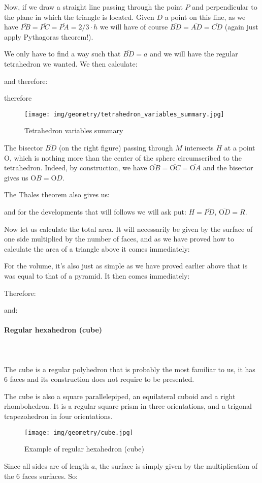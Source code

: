 {	Now, if we draw a straight line passing through the point $P$ and perpendicular to the plane in which the triangle is located. Given $D$ a point on this line, as we have $\overline{PB}=\overline{PC}=\overline{PA}=2/3\cdot h$ we will have of course $\overline{BD}=\overline{AD}=\overline{CD}$ (again just apply Pythagoras theorem!).
	
	We only have to find a way such that $\overline{BD}=a$ and we will have the regular tetrahedron we wanted. We then calculate:
	
	and therefore:
	
	therefore
	
	\begin{figure}[H]
		\centering
		\texttt{[image: img/geometry/tetrahedron\_variables\_summary.jpg]}
		\caption[]{Tetrahedron variables summary}
	\end{figure}
	The bisector $\overline{BD}$ (on the right figure) passing through $M$ intersects $H$ at a point O, which is nothing more than the center of the sphere circumscribed to the tetrahedron. Indeed, by construction, we have $\overline{\text{O}B}=\overline{\text{O}C}=\overline{\text{O}A}$ and the bisector gives us $\text{O}B=\text{O}D$.
	
	The Thales theorem also gives us:
	
	and for the developments that will follows we will ask put: $H=\overline{PD}$, $\overline{\text{O}D}=R$.
	
	Now let us calculate the total area. It will necessarily be given by the surface of one side multiplied by the number of faces, and as we have proved how to calculate the area of a triangle above it comes immediately:
	
	For the volume, it's also just as simple as we have proved earlier above that is was equal to that of a pyramid. It then comes immediately:
	
	Therefore:
	
	and:
	
	
	\pagebreak
	\paragraph{Regular hexahedron (cube)}\mbox{}\\\\
	The cube is a regular polyhedron that is probably the most familiar to us, it has $6$ faces and its construction  does not require to be presented.
	
	The cube is also a square parallelepiped, an equilateral cuboid and a right rhombohedron. It is a regular square prism in three orientations, and a trigonal trapezohedron in four orientations.
	\begin{figure}[H]
		\centering
		\texttt{[image: img/geometry/cube.jpg]}
		\caption{Example of regular hexahedron (cube)}
	\end{figure}
	Since all sides are of length $a$, the surface is simply given by the multiplication of the $6$ faces surfaces. So:
	
}
